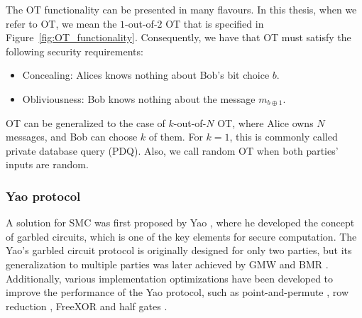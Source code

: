 The OT functionality can be presented in many flavours. In this thesis, when we refer to OT, we mean the $1$-out-of-$2$ OT that is specified in Figure~\ref{fig:OT_functionality}. Consequently, we have that OT must satisfy the following security requirements:

\begin{itemize}
	\item Concealing: Alices knows nothing about Bob's bit choice $b$.
	\item Obliviousness: Bob knows nothing about the message $m_{b\oplus 1}$.
\end{itemize}

OT can be generalized to the case of $k$-out-of-$N$ OT, where Alice owns $N$ messages, and Bob can choose $k$ of them. For $k=1$, this is commonly called private database query (PDQ). Also, we call random OT when both parties' inputs are random.


\subsubsection{Yao protocol}\label{yaoProtocol}

A solution for SMC was first proposed by Yao \cite{Yao82}, where he developed the concept of garbled circuits, which is one of the key elements for secure computation. The Yao's garbled circuit protocol is originally designed for only two parties, but its generalization to multiple parties was later achieved by GMW \cite{Goldreich87} and BMR \cite{BMR90}. Additionally, various implementation optimizations have been developed to improve the performance of the Yao protocol, such as point-and-permute \cite{BMR90}, row reduction \cite{NPS99, Pinkas2009}, FreeXOR \cite{Kolesnikov2005} and half gates \cite{Zahur2015}.

